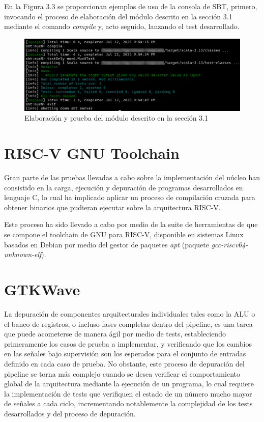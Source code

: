 En la Figura 3.3 se proporcionan ejemplos de uso de la consola de SBT, primero, invocando el proceso de elaboración del módulo descrito en la sección 3.1 mediante el comando \textit{compile} y, acto seguido, lanzando el test desarrollado.

\vspace{+0.3cm}
\begin{figure}[h]
  \centering
  \includegraphics[width=0.8 \linewidth]{res/img/sbt-usage-basic.png}
  \caption{Elaboración y prueba del módulo descrito en la sección 3.1}
\end{figure}

\section{RISC-V GNU Toolchain}

Gran parte de las pruebas llevadas a cabo sobre la implementación del núcleo han consistido en la carga, ejecución y depuración de programas desarrollados en lenguaje C, lo cual ha implicado aplicar un proceso de compilación cruzada para obtener binarios que pudieran ejecutar sobre la arquitectura RISC-V.

Este proceso ha sido llevado a cabo por medio de la suite de herramientas de que se compone el toolchain de GNU para RISC-V\cite{riscvtoolchain}, disponible en sistemas Linux basados en Debian por medio del gestor de paquetes \textit{apt} (paquete \textit{gcc-riscv64-unknown-elf}).

\section{GTKWave}

La depuración de componentes arquitecturales individuales tales como la ALU o el banco de registros, o incluso fases completas dentro del pipeline, es una tarea que puede acometerse de manera ágil por medio de tests, estableciendo primeramente los casos de prueba a implementar, y verificando que los cambios en las señales bajo supervisión son los esperados para el conjunto de entradas definido en cada caso de prueba. No obstante, este proceso de depuración del pipeline se torna más complejo cuando se desea verificar el comportamiento global de la arquitectura mediante la ejecución de un programa, lo cual requiere la implementación de tests que verifiquen el estado de un número mucho mayor de señales a cada ciclo, incrementando notablemente la complejidad de los tests desarrollados y del proceso de depuración.

